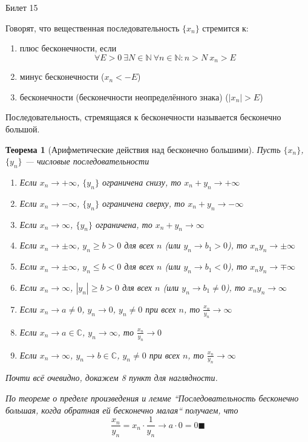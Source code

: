 \documentclass[12pt,a4paper]{article}
\newtheorem*{theorem*}{Теорема}
\begin{document}
\begin{center}
Билет 15
\end{center}

Говорят, что вещественная последовательность $\{x_n\}$ стремится к:
\begin{enumerate}
\item плюс бесконечности, если 
$$
\forall E>0\ \exists N \in \mathbb{N}\ \forall n \in \mathbb{N}: n > N\ x_n > E
$$
\item минус бесконечности ($x_n < -E$)
\item бесконечности (бесконечности неопределённого знака) ($|x_n| > E$)
\end{enumerate}

Последовательность, стремящаяся к бесконечности называется бесконечно большой.

\begin{theorem*}[Арифметические действия над бесконечно большими]
\label{15.1}
Пусть $\{x_n\}$, $\{y_n\}$ --- числовые последовательности
\begin{enumerate}
\item Если $x_n\rightarrow +\infty$, $\{y_n\}$ ограничена снизу, то $x_n+y_n\rightarrow +\infty$

\item Если $x_n\rightarrow -\infty$, $\{y_n\}$ ограничена сверху, то $x_n+y_n\rightarrow -\infty$

\item Если $x_n\rightarrow \infty$, $\{y_n\}$ ограничена, то $x_n+y_n\rightarrow \infty$

\item Если $x_n\rightarrow \pm\infty$, $y_n \geq b > 0$ для всех $n$ (или $y_n \rightarrow b_1 > 0$), то $x_n y_n \rightarrow \pm\infty$

\item Если $x_n\rightarrow \pm\infty$, $y_n \leq b < 0$ для всех $n$ (или $y_n \rightarrow b_1 < 0$), то $x_n y_n \rightarrow \mp\infty$

\item Если $x_n\rightarrow \infty$, $|y_n| \geq b > 0$ для всех $n$ (или $y_n \rightarrow b_1 \ne 0$), то $x_n y_n \rightarrow \infty$

\item Если $x_n \rightarrow a \ne 0$, $y_n \rightarrow 0$, $y_n \ne 0$ при всех $n$, то $\frac{x_n}{y_n} \rightarrow \infty$

\item Если $x_n \rightarrow a \in \mathbb{C}$, $y_n \rightarrow \infty$, то $\frac{x_n}{y_n} \rightarrow 0$

\item Если $x_n \rightarrow \infty$, $y_n \rightarrow b \in \mathbb{C}$, $y_n \ne 0$ при всех $n$, то $\frac{x_n}{y_n} \rightarrow \infty$
\end{enumerate}

Почти всё очевидно, докажем 8 пункт для наглядности.

По теореме о пределе произведения и лемме ``Последовательность бесконечно большая, когда обратная ей бесконечно малая`` получаем, что
$$
\frac{x_n}{y_n} = x_n \cdot \frac{1}{y_n} \rightarrow a \cdot 0 = 0 \blacksquare
$$
\end{theorem*}
\end{document}
